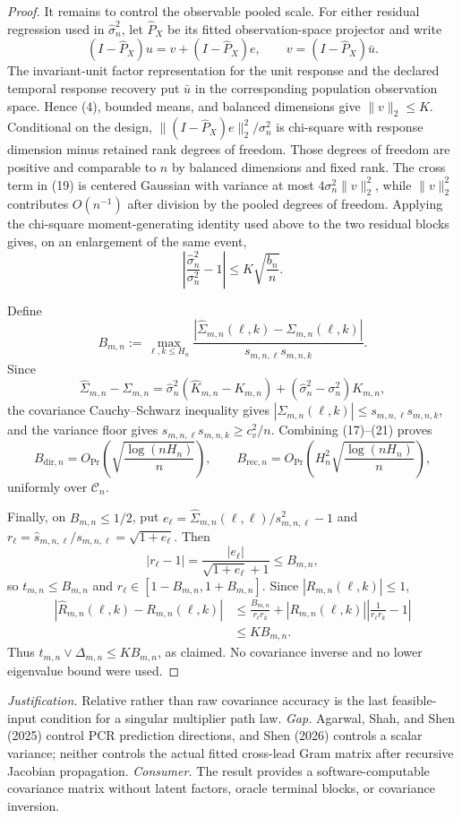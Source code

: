 \documentclass{article}
\begin{document}
\begin{proof}
It remains to control the observable pooled scale.  For either residual regression used in \(\widehat\sigma_n^2\), let \(\widehat P_X\) be its fitted observation-space projector and write
\[
 (I-\widehat P_X)u=v+(I-\widehat P_X)e,\qquad
 v=(I-\widehat P_X)\bar u.
 \tag{19}
\]
The invariant-unit factor representation for the unit response and the declared temporal response recovery put \(\bar u\) in the corresponding population observation space.  Hence (4), bounded means, and balanced dimensions give \(\|v\|_2\le K\).  Conditional on the design,
\(\|(I-\widehat P_X)e\|_2^2/\sigma_n^2\) is chi-square with response dimension minus retained rank degrees of freedom.  Those degrees of freedom are positive and comparable to \(n\) by balanced dimensions and fixed rank.  The cross term in (19) is centered Gaussian with variance at most \(4\sigma_n^2\|v\|_2^2\), while \(\|v\|_2^2\) contributes \(O(n^{-1})\) after division by the pooled degrees of freedom.  Applying the chi-square moment-generating identity used above to the two residual blocks gives, on an enlargement of the same event,
\[
 \left|\frac{\widehat\sigma_n^2}{\sigma_n^2}-1\right|
 \le K\sqrt{\frac{b_n}{n}}.
 \tag{20}
\]

Define
\[
 B_{m,n}:=\max_{\ell,k\le H_n}
 \frac{|\widehat\Sigma_{m,n}(\ell,k)-\Sigma_{m,n}(\ell,k)|}
 {s_{m,n,\ell}s_{m,n,k}}.
\]
Since
\[
 \widehat\Sigma_{m,n}-\Sigma_{m,n}
 =\widehat\sigma_n^2(\widehat K_{m,n}-K_{m,n})
  +(\widehat\sigma_n^2-\sigma_n^2)K_{m,n},
 \tag{21}
\]
the covariance Cauchy--Schwarz inequality gives
\(|\Sigma_{m,n}(\ell,k)|\le s_{m,n,\ell}s_{m,n,k}\), and the variance floor gives
\(s_{m,n,\ell}s_{m,n,k}\ge c_v^2/n\).  Combining (17)--(21) proves
\[
 B_{\mathrm{dir},n}=O_{\Pr}\!\left(\sqrt{\frac{\log(nH_n)}n}\right),
 \qquad
 B_{\mathrm{rec},n}=O_{\Pr}\!\left(H_n^2\sqrt{\frac{\log(nH_n)}n}\right),
 \tag{22}
\]
uniformly over \(\mathcal C_n\).

Finally, on \(B_{m,n}\le1/2\), put
\(e_\ell=\widehat\Sigma_{m,n}(\ell,\ell)/s_{m,n,\ell}^2-1\) and
\(r_\ell=\widehat s_{m,n,\ell}/s_{m,n,\ell}=\sqrt{1+e_\ell}\).  Then
\[
 |r_\ell-1|=\frac{|e_\ell|}{\sqrt{1+e_\ell}+1}\le B_{m,n},
\]
so \(t_{m,n}\le B_{m,n}\) and \(r_\ell\in[1-B_{m,n},1+B_{m,n}]\).  Since \(|R_{m,n}(\ell,k)|\le1\),
\[
\begin{aligned}
 |\widehat R_{m,n}(\ell,k)-R_{m,n}(\ell,k)|
 &\le \frac{B_{m,n}}{r_\ell r_k}
 +|R_{m,n}(\ell,k)|\left|\frac1{r_\ell r_k}-1\right|\\
 &\le K B_{m,n}.
\end{aligned}
\]
Thus \(t_{m,n}\vee\Delta_{m,n}\le K B_{m,n}\), as claimed.  No covariance inverse and no lower eigenvalue bound were used.
\end{proof}
\par\smallskip\noindent \textit{Justification.} Relative rather than raw covariance accuracy is the last feasible-input condition for a singular multiplier path law. \textit{Gap.} Agarwal, Shah, and Shen (2025) control PCR prediction directions, and Shen (2026) controls a scalar variance; neither controls the actual fitted cross-lead Gram matrix after recursive Jacobian propagation. \textit{Consumer.} The result provides a software-computable covariance matrix without latent factors, oracle terminal blocks, or covariance inversion.
\end{document}

